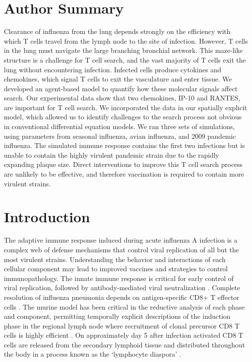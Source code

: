 \documentclass[10pt]{article}
\begin{document}
\section*{Author Summary}

Clearance of influenza from the lung depends strongly on the efficiency with which T cells travel from the lymph node to the site of infection.  However, T cells in the lung must navigate the large branching bronchial network.  This maze-like structure is a challenge for T cell search, and the vast majority of T cells exit the lung without encountering infection.  Infected cells produce cytokines and chemokines, which signal T cells to exit the vasculature and enter tissue.  We developed an agent-based model to quantify how these molecular signals affect search.  Our experimental data show that two chemokines, IP-10 and RANTES, are important for T cell search.  We incorporated the data in our spatially explicit model, which allowed us to identify challenges to the search process not obvious in conventional differential equation models.  We ran three sets of simulations, using parameters from seasonal influenza, avian influenza, and 2009 pandemic influenza.  The simulated immune response contains the first two infections but is unable to contain the highly virulent pandemic strain due to the rapidly expanding plaque size.  Direct interventions to improve this T cell search process are unlikely to be effective, and therefore vaccination is required to contain more virulent strains.

\section*{Introduction}

The adaptive immune response induced during acute influenza A infection is a complex web of defense mechanisms that control viral replication of all but the most virulent strains.  Understanding the behavior and interactions of each cellular component may lead to improved vaccines and strategies to control immunopathology.   The innate immune response is critical for early control of viral replication, followed by antibody-mediated viral neutralization \cite{Kohlmeier2009a, Joo2008, Oslund2011}.   Complete resolution of influenza pneumonia depends on antigen-specific CD8+ T effector cells \cite{Cerwenka1999, Kim2011}.  The murine model has been critical in the reductive analysis of each phase and component, permitting temporally explicit descriptions of the induction phase in the regional lymph node \cite{Miller2003, Allan2006, Ingulli2009} where recruitment of clonal precursor CD8 T cells is highly efficient \cite{VanHeijst2009}.   On approximately day 5 after infection activated CD8 T cells are released from the secondary lymphoid tissue \cite{Miao2010a} and distributed throughout the body in a process known as the ‘lymphocyte diaspora’ \cite{Marshall2001}.
\end{document}

